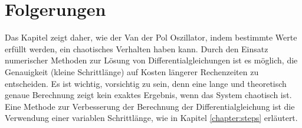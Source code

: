 %
%
%
\section{Folgerungen
\label{vanderpol:section:folgerungen}}
Das Kapitel zeigt daher, wie der Van der Pol Oszillator, indem bestimmte Werte erfüllt werden, ein chaotisches Verhalten haben kann. Durch den Einsatz numerischer Methoden zur Lösung von Differentialgleichungen ist es möglich, die Genauigkeit (kleine Schrittlänge) auf Kosten längerer Rechenzeiten zu entscheiden. Es ist wichtig, vorsichtig zu sein, denn eine lange und theoretisch genaue Berechnung zeigt kein exaktes Ergebnis, wenn das System chaotisch ist. 
Eine Methode zur Verbesserung der Berechnung der Differentialgleichung ist die Verwendung einer variablen Schrittlänge, wie in Kapitel \ref{chapter:steps} erläutert. 